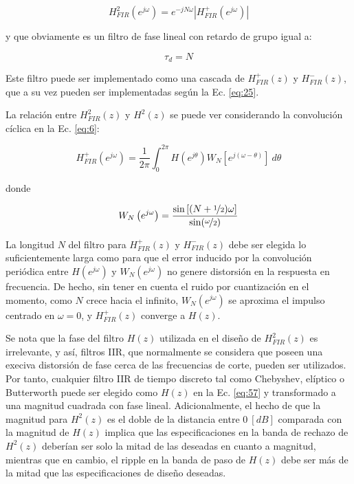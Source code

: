     \begin{equation}
      H_{FIR}^{ 2 }\left( e^{j\omega} \right) = e^{-jN\omega} | H_{FIR}^{ +}\left( e^{j\omega} \right) |
    \end{equation}

    y que obviamente es un filtro de fase lineal con retardo de grupo igual a:

    \begin{equation}
      \tau_d = N
    \end{equation}

    Este filtro puede ser implementado como una cascada de $H_{FIR}^{ +}(z)$ y $H_{FIR}^{ -}(z)$, que a su vez pueden ser implementadas según la Ec. \ref{eq:25}.

    La relación entre $H_{FIR}^{2}(z)$ y $H^2(z)$ se puede ver considerando la convolución cíclica en la Ec. \ref{eq:6}:

    \begin{equation}
      H_{FIR}^{ + } \left( e^{j\omega} \right) = \frac{1}{2\pi} \int_0^{2\pi}{H \left( e^{j\theta} \right) W_N \left[ e^{j(\omega-\theta)} \right] \: d\theta}
    \end{equation}

    donde

    \begin{equation}
      W_N \left( e^{j\omega} \right) = \frac{\sin \left[ (N + \nicefrac{1}{2}) \omega\right]}{\sin (\nicefrac{\omega}{2})}
    \end{equation}

    La longitud $N$ del filtro para $H_{FIR}^{ +}(z)$ y $H_{FIR}^{ -}(z)$ debe ser elegida lo suficientemente larga como para que el error inducido por la convolución periódica entre $H \left( e^{j\omega} \right)$ y $W_N \left( e^{j\omega} \right)$ no genere distorsión en la respuesta en frecuencia. De hecho, sin tener en cuenta el ruido por cuantización en el momento, como $N$ crece hacia el infinito, $W_N \left( e^{j\omega} \right)$ se aproxima el impulso centrado en $\omega = 0$, y $H_{FIR}^{ +}(z)$ converge a $H(z)$.

    Se nota que la fase del filtro $H(z)$ utilizada en el diseño de $H^2_{FIR}(z)$ es irrelevante, y así, filtros IIR, que normalmente se considera que poseen una execiva distorsión de fase cerca de las frecuencias de corte, pueden ser utilizados. Por tanto, cualquier filtro IIR de tiempo discreto tal como Chebyshev, elíptico o Butterworth puede ser elegido como $H(z)$ en la Ec. \ref{eq:57} y transformado a una magnitud cuadrada con fase lineal. Adicionalmente, el hecho de que la magnitud para $H^2(z)$ es el doble de la distancia entre $0 \: [dB]$ comparada con la magnitud de $H(z)$ implica que las especificaciones en la banda de rechazo de $H^2(z)$ deberían ser solo la mitad de las deseadas en cuanto a magnitud, mientras que en cambio, el ripple en la banda de paso de $H(z)$ debe ser más de la mitad que las especificaciones de diseño deseadas.

